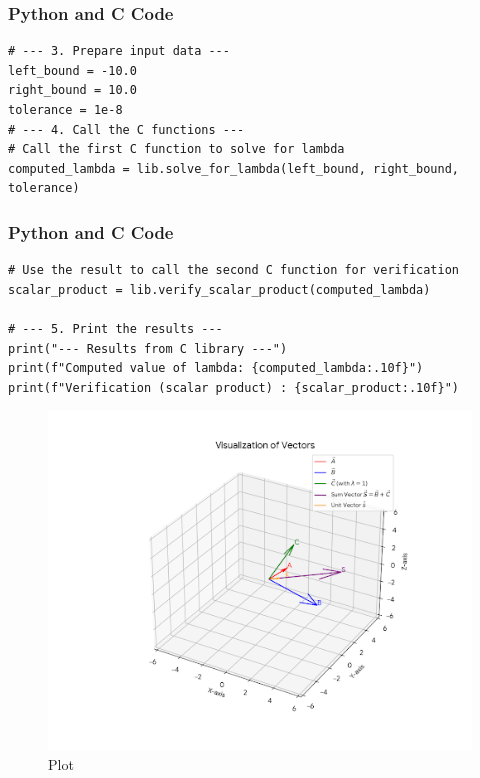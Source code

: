 \documentclass{beamer}
\begin{document}
\begin{frame}[fragile]
\frametitle{Python and C Code}
\begin{lstlisting}
# --- 3. Prepare input data ---
left_bound = -10.0
right_bound = 10.0
tolerance = 1e-8
# --- 4. Call the C functions ---
# Call the first C function to solve for lambda
computed_lambda = lib.solve_for_lambda(left_bound, right_bound, tolerance)
\end{lstlisting}
\end{frame}

\begin{frame}[fragile]
\frametitle{Python and C Code}
\begin{lstlisting}
# Use the result to call the second C function for verification
scalar_product = lib.verify_scalar_product(computed_lambda)

# --- 5. Print the results ---
print("--- Results from C library ---")
print(f"Computed value of lambda: {computed_lambda:.10f}")
print(f"Verification (scalar product) : {scalar_product:.10f}")

\end{lstlisting}

\end{frame}

\begin{figure}[H]
    \centering
    \includegraphics[width=0.7\columnwidth]{Fig.png}
    \caption{Plot}
    \label{fig:placeholder}
\end{figure}
\end{document}
